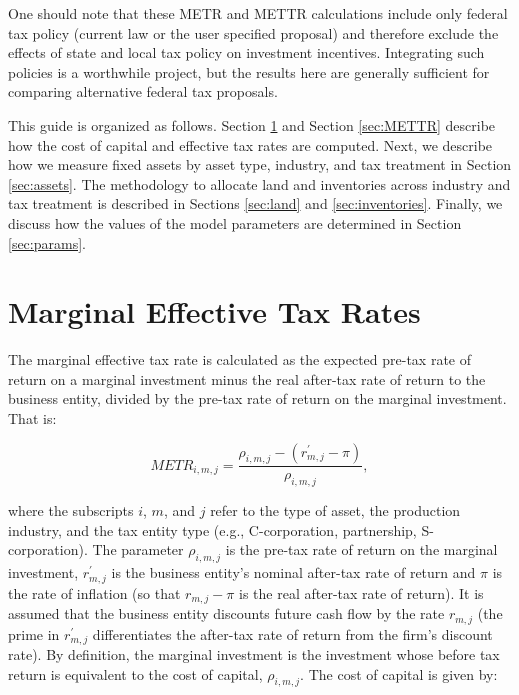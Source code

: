 \documentclass[article,11pt,letterpaper,fleqn]{article}
\theoremstyle{definition}
\numberwithin{equation}{section}
\begin{document}
One should note that these METR and METTR calculations include only federal tax policy (current law or the user specified proposal) and therefore exclude the effects of state and local tax policy on investment incentives.  Integrating such policies is a worthwhile project, but the results here are generally sufficient for comparing alternative federal tax proposals.


This guide is organized as follows.  Section \ref{sec:METR} and Section \ref{sec:METTR} describe how the cost of capital and effective tax rates are computed.  Next, we describe how we measure fixed assets by asset type, industry, and tax treatment in Section \ref{sec:assets}.  The methodology to allocate land and inventories across industry and tax treatment is described in Sections \ref{sec:land} and \ref{sec:inventories}.  Finally, we discuss how the values of the model parameters are determined in Section \ref{sec:params}.

\section{Marginal Effective Tax Rates}
\label{sec:METR}

The marginal effective tax rate is calculated as the expected pre-tax rate of return on a marginal investment minus the real after-tax rate of return to the business entity, divided by the pre-tax rate of return on the marginal investment.  That is: 

\begin{equation}
METR_{i,m,j} = \frac{\rho_{i,m,j} - (r^{'}_{m,j}-\pi)}{\rho_{i,m,j}},
\end{equation}

\noindent\noindent where the subscripts $i$, $m$, and $j$ refer to the type of asset, the production industry, and the tax entity type (e.g., C-corporation, partnership, S-corporation).  The parameter $\rho_{i,m,j}$ is the pre-tax rate of return on the marginal investment, $r^{'}_{m,j}$ is the business entity's nominal after-tax rate of return and $\pi$ is the rate of inflation (so that $r_{m,j}-\pi$ is the real after-tax rate of return).  It is assumed that the business entity discounts future cash flow by the rate $r_{m,j}$ (the prime in $r^{'}_{m,j}$ differentiates the after-tax rate of return from the firm's discount rate).  By definition, the marginal investment is the investment whose before tax return is equivalent to the cost of capital, $\rho_{i,m,j}$.  The cost of capital is given by:
\end{document}
